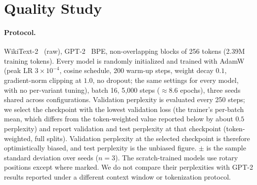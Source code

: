 \documentclass[10pt]{article}
\begin{document}
\section{Quality Study}
\label{sec:quality}

\paragraph{Protocol.}
WikiText-2~\citep{merity2017wikitext} (raw), GPT-2~\citep{radford2019gpt2} BPE,
non-overlapping blocks of 256 tokens (2.39M training tokens). Every model is
randomly initialized and trained with AdamW (peak LR $3\times10^{-4}$, cosine
schedule, 200 warm-up steps, weight decay $0.1$, gradient-norm clipping at $1.0$,
no dropout; the same settings for every model, with no per-variant tuning),
batch 16, 5{,}000 steps ($\approx8.6$ epochs), three seeds shared across
configurations. Validation perplexity is evaluated every
250 steps; we select the checkpoint with the lowest validation loss (the trainer's
per-batch mean, which differs from the token-weighted value reported below by
about $0.5$ perplexity) and report validation and test perplexity at that
checkpoint (token-weighted, full splits). Validation perplexity at the selected
checkpoint is therefore optimistically biased, and test perplexity is the
unbiased figure.
$\pm$ is the sample standard deviation over seeds ($n{=}3$). The scratch-trained models use rotary positions except where marked. We do not
compare their perplexities with GPT-2 results reported under a different context
window or tokenization protocol.
\end{document}
